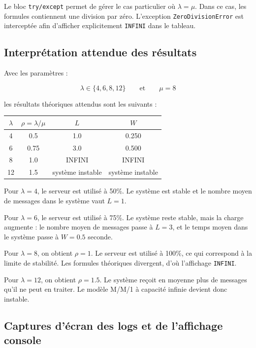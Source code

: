 \documentclass{article}
\begin{document}
Le bloc \texttt{try/except} permet de gérer le cas particulier où \(\lambda = \mu\). Dans ce cas, les formules contiennent une division par zéro. L'exception \texttt{ZeroDivisionError} est interceptée afin d'afficher explicitement \texttt{INFINI} dans le tableau.

\subsection{Interprétation attendue des résultats}

Avec les paramètres :

\[
\lambda \in \{4, 6, 8, 12\}
\qquad \text{et} \qquad
\mu = 8
\]

les résultats théoriques attendus sont les suivants :

\begin{center}
\begin{tabular}{|c|c|c|c|}
\hline
\(\lambda\) & \(\rho = \lambda / \mu\) & \(L\) & \(W\) \\
\hline
4 & 0.5 & 1.0 & 0.250 \\
\hline
6 & 0.75 & 3.0 & 0.500 \\
\hline
8 & 1.0 & INFINI & INFINI \\
\hline
12 & 1.5 & système instable & système instable \\
\hline
\end{tabular}
\end{center}

Pour \(\lambda = 4\), le serveur est utilisé à 50\%. Le système est stable et le nombre moyen de messages dans le système vaut \(L = 1\).

Pour \(\lambda = 6\), le serveur est utilisé à 75\%. Le système reste stable, mais la charge augmente : le nombre moyen de messages passe à \(L = 3\), et le temps moyen dans le système passe à \(W = 0.5\) seconde.

Pour \(\lambda = 8\), on obtient \(\rho = 1\). Le serveur est utilisé à 100\%, ce qui correspond à la limite de stabilité. Les formules théoriques divergent, d'où l'affichage \texttt{INFINI}.

Pour \(\lambda = 12\), on obtient \(\rho = 1.5\). Le système reçoit en moyenne plus de messages qu'il ne peut en traiter. Le modèle M/M/1 à capacité infinie devient donc instable.

\subsection{Captures d'écran des logs et de l'affichage console}
\end{document}
